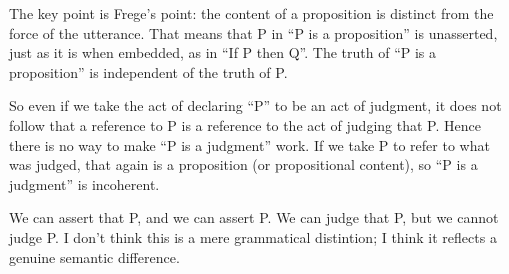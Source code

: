 The key point is Frege's point: the content of a proposition is
distinct from the force of the utterance.  That means that P in ``P is
a proposition'' is unasserted, just as it is when embedded, as in ``If
P then Q''.  The truth of ``P is a proposition'' is independent of the
truth of P.

So even if we take the act of declaring ``P'' to be an act of
judgment, it does not follow that a reference to P is a reference to
the act of judging that P.  Hence there is no way to make ``P is a
judgment'' work.  If we take P to refer to what was judged, that again
is a proposition (or propositional content), so ``P is a judgment'' is
incoherent.

\begin{remark}
  We can assert that P, and we can assert P.  We can judge that P, but
  we cannot judge P.  I don't think this is a mere grammatical
  distintion; I think it reflects a genuine semantic difference.
\end{remark}


